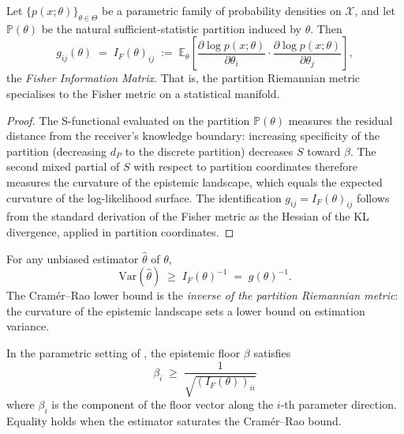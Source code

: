 \begin{theorem}
\label{thm:ch02-fisher}
Let $\{p(x;\theta)\}_{\theta \in \Theta}$ be a parametric family of probability
densities on $\mathcal{X}$, and let $\mathbb{P}(\theta)$ be the natural
sufficient-statistic partition induced by $\theta$.  Then
\[
  g_{ij}(\theta)
  \;=\;
  I_F(\theta)_{ij}
  \;:=\;
  \mathbb{E}_\theta\!\left[
    \frac{\partial \log p(x;\theta)}{\partial \theta_i}
    \cdot
    \frac{\partial \log p(x;\theta)}{\partial \theta_j}
  \right],
\]
the \emph{Fisher Information Matrix}.  That is, the partition Riemannian metric
specialises to the Fisher metric on a statistical manifold.
\end{theorem}

\begin{proof}
The S-functional evaluated on the partition $\mathbb{P}(\theta)$ measures the
residual distance from the receiver's knowledge boundary: increasing specificity
of the partition (decreasing $d_P$ to the discrete partition) decreases $S$
toward $\beta$.  The second mixed partial of $S$ with respect to partition
coordinates therefore measures the curvature of the epistemic landscape, which
equals the expected curvature of the log-likelihood surface.  The identification
$g_{ij} = I_F(\theta)_{ij}$ follows from the standard derivation of the Fisher
metric as the Hessian of the KL divergence, applied in partition coordinates.
\end{proof}

\begin{corollary}
\label{cor:ch02-cramer-rao}
For any unbiased estimator $\hat{\theta}$ of $\theta$,
\[
  \mathrm{Var}(\hat{\theta}) \;\geq\; I_F(\theta)^{-1} \;=\; g(\theta)^{-1}.
\]
The Cram\'{e}r--Rao lower bound is the \emph{inverse of the partition Riemannian
metric}: the curvature of the epistemic landscape sets a lower bound on
estimation variance.
\end{corollary}

\begin{theorem}
\label{thm:ch02-floor-fisher}
In the parametric setting of , the epistemic floor
$\beta$ satisfies
\[
  \beta_i \;\geq\; \frac{1}{\sqrt{(I_F(\theta))_{ii}}}
\]
where $\beta_i$ is the component of the floor vector along the $i$-th
parameter direction.  Equality holds when the estimator saturates the
Cram\'{e}r--Rao bound.
\end{theorem}

